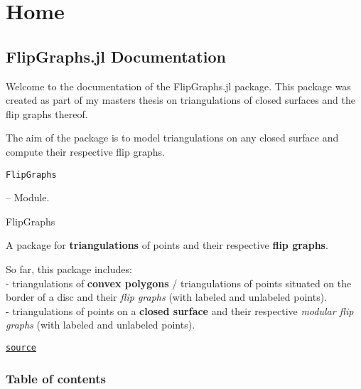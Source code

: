 \newcommand{\DocMainTitle}{FlipGraphs.jl}
\newcommand{\DocVersion}{}
\newcommand{\DocAuthors}{}
\newcommand{\JuliaVersion}{1.6.7}




\part{Home}


\chapter{FlipGraphs.jl Documentation}



\label{9941595177337991025}{}


Welcome to the documentation of the FlipGraphs.jl package.  This package was created as part of my master{\textquotesingle}s thesis on triangulations of closed surfaces and the flip graphs thereof.



The aim of the package is to model triangulations on any closed surface and  compute their respective flip graphs.


\hypertarget{2470651749692249226}{\texttt{FlipGraphs}}  -- {Module.}

\begin{adjustwidth}{2em}{0pt}

FlipGraphs

A package for \textbf{triangulations} of points and their respective \textbf{flip graphs}.

So far, this package includes:\\
- triangulations of \textbf{convex polygons} / triangulations of points situated on the border of a disc and their \emph{flip graphs} (with labeled and unlabeled points).\\
- triangulations of points on a \textbf{closed surface} and their respective \emph{modular flip graphs} (with labeled and unlabeled points).



\href{https://github.com/schto223/FlipGraphs.jl/blob/490c01a7adf74b42f27dda05099165c47ae8133e/src/FlipGraphs.jl#L9-L17}{\texttt{source}}


\end{adjustwidth}

\section{Table of contents}




